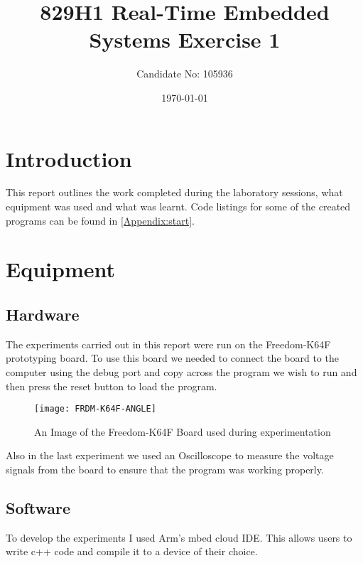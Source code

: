 \documentclass[a4paper,12pt]{scrartcl}
\title{829H1 Real-Time Embedded Systems Exercise 1}
\author{Candidate No: 105936}
\date{\today}
\begin{document}
	
	\begin{titlepage}
		\maketitle
	\end{titlepage}
	
	\tableofcontents
	\newpage
	
	\section{Introduction}
	{
		This report outlines the work completed during the laboratory sessions, what equipment was used and what was learnt. Code listings for some of the created programs can be found in \cref{Appendix:start}.
	}

	\section{Equipment}
	{
		\subsection{Hardware}{
			The experiments carried out in this report were run on the Freedom-K64F prototyping board\cite{nxpproducts2014}. To use this board we needed to connect the board to the computer using the debug port and copy across the program we wish to run and then press the reset button to load the program.
			\begin{figure}[h]
				\centering
				\texttt{[image: FRDM-K64F-ANGLE]}
				\caption{An Image of the Freedom-K64F Board used during experimentation\cite{nxpproducts2014}}
				\label{img:FRDM-K64F}
			\end{figure}
			Also in the last experiment we used an Oscilloscope to measure the voltage signals from the board to ensure that the program was working properly.
		}
		\subsection{Software}
		{
			To develop the experiments I used Arm's mbed cloud IDE. This allows users to write c++ code and compile it to a device of their choice. 
		}
	}
	
\end{document}
